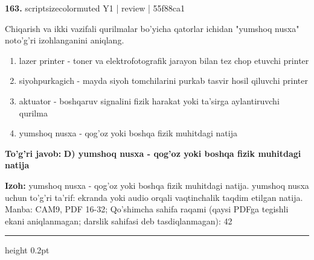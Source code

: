 \documentclass[10pt,a4paper]{article}
\begin{document}
{\bfseries\sffamily\color{ink} 163.} {scriptsizecolor{muted} Y1 | review | 55f88ca1}
\par
Chiqarish va ikki vazifali qurilmalar bo'yicha qatorlar ichidan "yumshoq nusxa" noto'g'ri izohlanganini aniqlang.
\begin{enumerate}[label=\Alph*),leftmargin=9mm]
\item lazer printer - toner va elektrofotografik jarayon bilan tez chop etuvchi printer
\item siyohpurkagich - mayda siyoh tomchilarini purkab tasvir hosil qiluvchi printer
\item aktuator - boshqaruv signalini fizik harakat yoki ta'sirga aylantiruvchi qurilma
\item yumshoq nusxa - qog'oz yoki boshqa fizik muhitdagi natija
\end{enumerate}
\begin{tcolorbox}[enhanced,breakable,colback=teal!4,colframe=teal!60!black,boxrule=0.45pt,arc=1.2mm,left=2.7mm,right=2.7mm,top=1.8mm,bottom=1.8mm,before skip=2mm,after skip=2mm]
{\bfseries\sffamily\color{teal}To'g'ri javob:} \textbf{D) yumshoq nusxa - qog'oz yoki boshqa fizik muhitdagi natija}
\par\smallskip
{\bfseries Izoh:} yumshoq nusxa - qog'oz yoki boshqa fizik muhitdagi natija. yumshoq nusxa uchun to'g'ri ta'rif: ekranda yoki audio orqali vaqtinchalik taqdim etilgan natija. Manba: CAM9, PDF 16-32; Qo'shimcha sahifa raqami (qaysi PDFga tegishli ekani aniqlanmagan; darslik sahifasi deb tasdiqlanmagan): 42
\end{tcolorbox}
\vspace{2mm}\hrule height 0.2pt\vspace{3mm}
\end{document}
